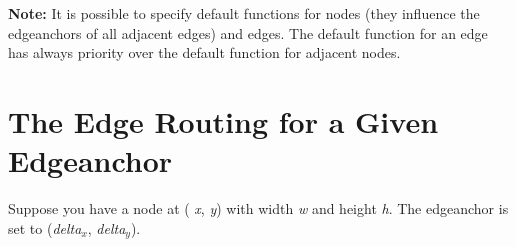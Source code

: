 \documentclass[twoside,fleqn]{report}
\begin{document}
\textbf{Note:} 
It is possible to specify default functions for nodes (they influence the edgeanchors
of all adjacent edges) and edges.
The default function for an edge has always priority over the default
function for adjacent nodes.


\section{The Edge Routing for a Given Edgeanchor}

Suppose you have a node at (
\emph{x}, 
\emph{y}) with width 
\emph{w} and height 
\emph{h}.
The edgeanchor is set to (\emph{delta$_x$}, \emph{delta$_y$}).

\end{document}
